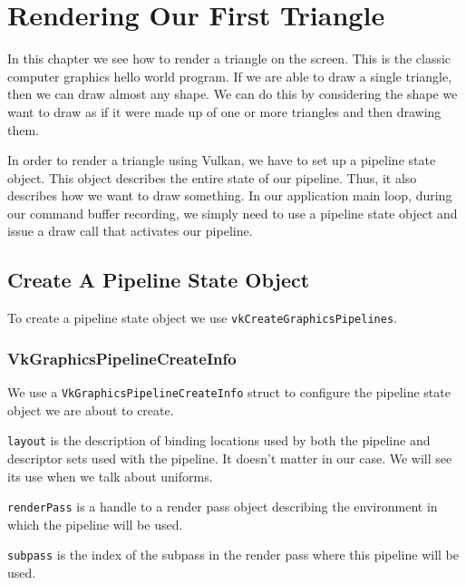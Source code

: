 \chapter{Rendering Our First Triangle}

In this chapter we see how to render a triangle on the screen.
This is the classic computer graphics hello world program.
If we are able to draw a single triangle, then we can draw almost any shape.
We can do this by considering the shape we want to draw as if it were
made up of one or more triangles and then drawing them.

In order to render a triangle using Vulkan, we have to set up a pipeline state
object.
This object describes the entire state of our pipeline.
Thus, it also describes how we want to draw something.
In our application main loop, during our command buffer recording, we
simply need to use a pipeline state object and issue a draw call that activates
our pipeline.

\section{Create A Pipeline State Object}

To create a pipeline state object we use \texttt{vkCreateGraphicsPipelines}.

\begin{minipage}{\linewidth}{\noindent}
    
\end{minipage}

\subsection{VkGraphicsPipelineCreateInfo}

We use a \texttt{VkGraphicsPipelineCreateInfo} struct to configure the pipeline state
object we are about to create.

\texttt{layout} is the description of binding locations used by both the pipeline
and descriptor sets used with the pipeline.
It doesn't matter in our case.
We will see its use when we talk about uniforms.

\texttt{renderPass} is a handle to a render pass object describing the environment
in which the pipeline will be used.

\texttt{subpass} is the index of the subpass in the render pass where
this pipeline will be used.

